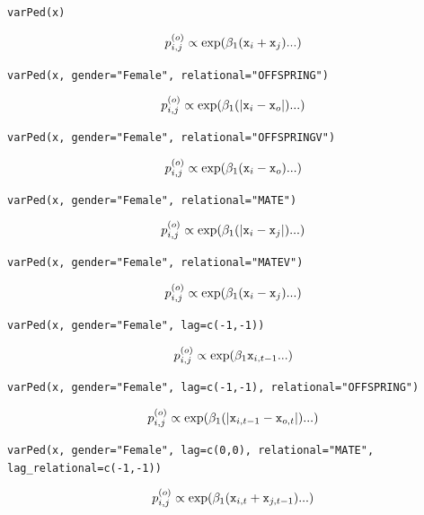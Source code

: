 \documentclass{article}
\begin{document}
\texttt{varPed(x)}

\begin{equation}
p^{(o)}_{i,j} \propto \textrm{exp}(\beta_{1}(\textrm{\texttt{x}}_{i}+\textrm{\texttt{x}}_{j})...)
\end{equation}

\texttt{varPed(x, gender="Female", relational="OFFSPRING")}

\begin{equation}
p^{(o)}_{i,j} \propto \textrm{exp}(\beta_{1}(|\textrm{\texttt{x}}_{i}-\textrm{\texttt{x}}_{o}|)...)
\end{equation}

\texttt{varPed(x, gender="Female", relational="OFFSPRINGV")}

\begin{equation}
p^{(o)}_{i,j} \propto \textrm{exp}(\beta_{1}(\textrm{\texttt{x}}_{i}-\textrm{\texttt{x}}_{o})...)
\end{equation}

\texttt{varPed(x, gender="Female", relational="MATE")}

\begin{equation}
p^{(o)}_{i,j} \propto \textrm{exp}(\beta_{1}(|\textrm{\texttt{x}}_{i}-\textrm{\texttt{x}}_{j}|)...)
\end{equation}

\texttt{varPed(x, gender="Female", relational="MATEV")}

\begin{equation}
p^{(o)}_{i,j} \propto \textrm{exp}(\beta_{1}(\textrm{\texttt{x}}_{i}-\textrm{\texttt{x}}_{j})...)
\end{equation}

\texttt{varPed(x, gender="Female", lag=c(-1,-1))}

\begin{equation}
p^{(o)}_{i,j} \propto \textrm{exp}(\beta_{1}\textrm{\texttt{x}}_{i,t-1}...)
\end{equation}

\texttt{varPed(x, gender="Female", lag=c(-1,-1), relational="OFFSPRING")}

\begin{equation}
p^{(o)}_{i,j} \propto \textrm{exp}(\beta_{1}(|\textrm{\texttt{x}}_{i,t-1}-\textrm{\texttt{x}}_{o,t}|)...)
\end{equation}

\texttt{varPed(x, gender="Female", lag=c(0,0), relational="MATE",}\\
\texttt{lag\_relational=c(-1,-1))}

\begin{equation}
p^{(o)}_{i,j} \propto \textrm{exp}(\beta_{1}(\textrm{\texttt{x}}_{i,t}+\textrm{\texttt{x}}_{j,t-1})...)
\end{equation}\\
\end{document}
